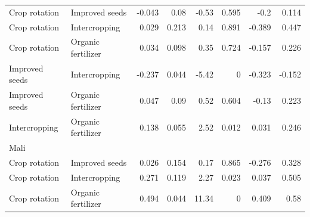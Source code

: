 \documentclass[
]{article}
\begin{document}
\begin{table}[]
{\begin{tabular}{llrrrrrr}
Crop rotation  & Improved seeds     & -0.043                          & 0.08                                 & -0.53                 & 0.595                                & -0.2                  & 0.114                 \\
Crop rotation  & Intercropping      & 0.029                           & 0.213                                & 0.14                  & 0.891                                & -0.389                & 0.447                 \\
Crop rotation  & Organic fertilizer & 0.034                           & 0.098                                & 0.35                  & 0.724                                & -0.157                & 0.226                 \\
Improved seeds & Intercropping      & -0.237                          & 0.044                                & -5.42                 & 0                                    & -0.323                & -0.152                \\
Improved seeds & Organic fertilizer & 0.047                           & 0.09                                 & 0.52                  & 0.604                                & -0.13                 & 0.223                 \\
Intercropping  & Organic fertilizer & 0.138                           & 0.055                                & 2.52                  & 0.012                                & 0.031                 & 0.246                 \\ \hline
\multicolumn{8}{l}{\cellcolor[HTML]{DBE8FF}Mali}                                                                                                                                                                            \\ \hline
Crop rotation  & Improved seeds     & 0.026                           & 0.154                                & 0.17                  & 0.865                                & -0.276                & 0.328                 \\
Crop rotation  & Intercropping      & 0.271                           & 0.119                                & 2.27                  & 0.023                                & 0.037                 & 0.505                 \\
Crop rotation  & Organic fertilizer & 0.494                           & 0.044                                & 11.34                 & 0                                    & 0.409                 & 0.58                  \\

\end{tabular}}
\end{table}
\end{document}
